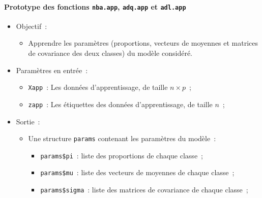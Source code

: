 \documentclass[a4paper,10pt]{report}
\begin{document}
\paragraph{Prototype des fonctions \texttt{nba.app}, \texttt{adq.app} et \texttt{adl.app}}
\begin{itemize}
	\item Objectif~:
	\begin{itemize}
		\item Apprendre les paramètres (proportions, vecteurs de moyennes et matrices de covariance des deux classes) du modèle considéré.
	\end{itemize}
	
	\item Paramètres en entrée~:
	\begin{itemize}
		\item \texttt{Xapp}~: Les données d'apprentissage, de taille $n \times p$~;
		\item \texttt{zapp}~: Les étiquettes des données d'apprentissage, de taille $n$~;
	\end{itemize}

	\item Sortie~:
	\begin{itemize}
		\item Une structure \texttt{params} contenant les paramètres du modèle~:
		\begin{itemize}
			\item \texttt{params\$pi}~: liste des proportions de chaque classe~;
			\item \texttt{params\$mu}~: liste des vecteurs de moyennes de chaque classe~;
			\item \texttt{params\$sigma}~: liste des matrices de covariance de chaque classe~;
		\end{itemize}
	\end{itemize}
	

\end{itemize}
\end{document}
